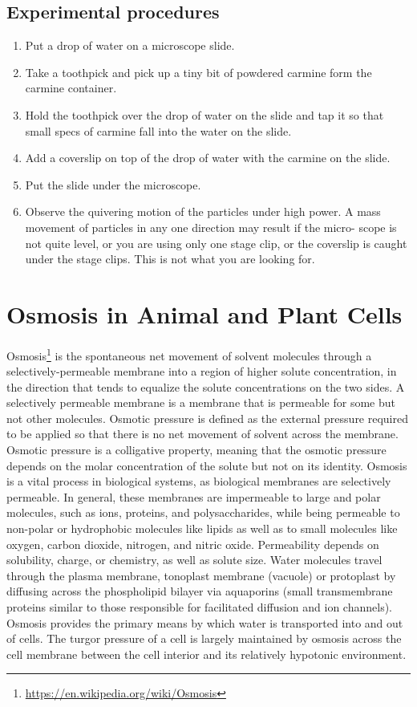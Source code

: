 \documentclass[]{book}
\providecommand{\tightlist}{%
  \setlength{\itemsep}{0pt}\setlength{\parskip}{0pt}}
\let\rmarkdownfootnote\footnote%
\def\footnote{\protect\rmarkdownfootnote}
\renewcommand{\href}[2]{#2\footnote{\url{#1}}}
\theoremstyle{definition}
\theoremstyle{definition}
\theoremstyle{definition}
\theoremstyle{remark}
\begin{document}
\subsection{Experimental procedures}\label{experimental-procedures-17}

\begin{enumerate}
\def\labelenumi{\arabic{enumi}.}
\tightlist
\item
  Put a drop of water on a microscope slide.
\item
  Take a toothpick and pick up a tiny bit of powdered carmine form the
  carmine container.
\item
  Hold the toothpick over the drop of water on the slide and tap it so
  that small specs of carmine fall into the water on the slide.
\item
  Add a coverslip on top of the drop of water with the carmine on the
  slide.
\item
  Put the slide under the microscope.
\item
  Observe the quivering motion of the particles under high power. A mass
  movement of particles in any one direction may result if the micro-
  scope is not quite level, or you are using only one stage clip, or the
  coverslip is caught under the stage clips. This is not what you are
  looking for.
\end{enumerate}

\section{Osmosis in Animal and Plant
Cells}\label{osmosis-in-animal-and-plant-cells}

\href{https://en.wikipedia.org/wiki/Osmosis}{Osmosis} is the spontaneous
net movement of solvent molecules through a selectively-permeable
membrane into a region of higher solute concentration, in the direction
that tends to equalize the solute concentrations on the two sides. A
selectively permeable membrane is a membrane that is permeable for some
but not other molecules. Osmotic pressure is defined as the external
pressure required to be applied so that there is no net movement of
solvent across the membrane. Osmotic pressure is a colligative property,
meaning that the osmotic pressure depends on the molar concentration of
the solute but not on its identity. Osmosis is a vital process in
biological systems, as biological membranes are selectively permeable.
In general, these membranes are impermeable to large and polar
molecules, such as ions, proteins, and polysaccharides, while being
permeable to non-polar or hydrophobic molecules like lipids as well as
to small molecules like oxygen, carbon dioxide, nitrogen, and nitric
oxide. Permeability depends on solubility, charge, or chemistry, as well
as solute size. Water molecules travel through the plasma membrane,
tonoplast membrane (vacuole) or protoplast by diffusing across the
phospholipid bilayer via aquaporins (small transmembrane proteins
similar to those responsible for facilitated diffusion and ion
channels). Osmosis provides the primary means by which water is
transported into and out of cells. The turgor pressure of a cell is
largely maintained by osmosis across the cell membrane between the cell
interior and its relatively hypotonic environment.
\end{document}
